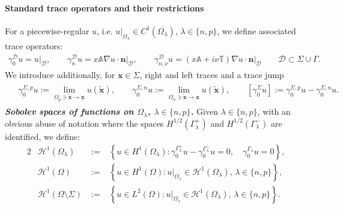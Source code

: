 \documentclass[report]{elsarticle}
\numberwithin{theorem}{section}
\renewcommand{\vec}[1]{\mathbf{#1}}
\begin{document}
\paragraph{\textbf{Standard trace operators and their restrictions}}
For a piecewise-regular $u$,  i.e. $\left. u\right|_{\Omega_{\lambda}}\in C^1(\overline{\Omega_{\lambda}})$, $\lambda\in \{n,p\}$,  we define associated trace operators:
\begin{align}
	\label{eq:nmtraces}
	\gamma_0^\mathcal{D}u=\left. u\right|_{\mathcal{D}},   \qquad
	\gamma_n^\mathcal{D}u=\left.x \mathbb{A}\nabla u\cdot \vec{n}\right|_{\mathcal{D}}, \qquad\gamma_{n, \nu}^{\mathcal{D}}u=\left.(x \mathbb{A}+i\nu\mathbb{T})\nabla u\cdot \vec{n}\right|_{\mathcal{D}}\qquad  \mathcal{D}\subset \Sigma\cup\Gamma.
\end{align}
We introduce additionally, for $\vec{x}\in \Sigma$, right and left traces and a trace jump
\begin{align}
	\label{eq:trace_left_right}
	\begin{split}
		&\gamma_0^{\Sigma,p}u:=\lim\limits_{\Omega_p\ni \tilde{\vec{x}}\rightarrow \vec{x}}u(\tilde{\vec{x}}), \qquad	\gamma_0^{\Sigma,n}u:=\lim\limits_{\Omega_n\ni \tilde{\vec{x}}\rightarrow \vec{x}}u(\tilde{\vec{x}}),\qquad [\gamma_0^{\Sigma}u]:=	\gamma_0^{\Sigma,p}u-\gamma_0^{\Sigma,n}u.
	\end{split}	
\end{align}	
\textit{\textbf{Sobolev spaces of functions on $\Omega_{\lambda}$, $\lambda\in \{n,p\}$. }}	Given $\lambda\in \{n,p\}$, with an obvious abuse of notation where the spaces $H^{1/2}(\Gamma_{\lambda}^+)$ and $H^{1/2}(\Gamma_{\lambda}^{-})$ are identified, we define:
\begin{alignat*}{2}
	&\mathcal{H}^1(\Omega_{\lambda}) 
	&\;:=\; &\left\{ u \in H^1(\Omega_{\lambda}) : \gamma_{0}^{\Gamma_{\lambda}^+}u - \gamma_{0}^{\Gamma_{\lambda}^{-}}u = 0, \quad \gamma_{0}^{\Gamma_{\lambda}} u = 0 \right\}, \\
	&\mathcal{H}^1(\Omega) 
	&\;:=\; &\left\{ u \in H^1(\Omega) : \left. u \right|_{\Omega_{\lambda}} \in \mathcal{H}^1(\Omega_{\lambda}), \, \lambda \in \{n, p\} \right\},\\
	&\mathcal{H}^1(\Omega\setminus\Sigma) 
	&\;:=\; &\left\{ u \in L^2 (\Omega) : \left. u \right|_{\Omega_{\lambda}} \in \mathcal{H}^1(\Omega_{\lambda}), \, \lambda \in \{n, p\} \right\}.
\end{alignat*}
\end{document}
